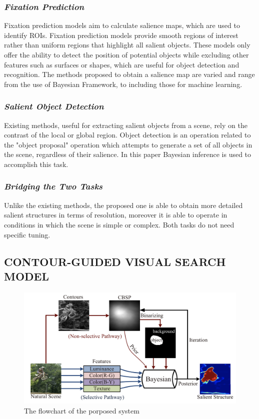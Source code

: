 \subsubsection{\emph{Fixation Prediction}}
Fixation prediction models aim to calculate salience maps, which are used to 
identify ROIs. Fixation prediction models provide smooth regions of interest 
rather than uniform regions that highlight all salient objects. These models 
only offer the ability to detect the position of potential objects while excluding 
other features such as surfaces or shapes, which are useful for object 
detection and recognition. The methods proposed to obtain a salience map 
are varied and range from the use of Bayesian Framework, to including those 
for machine learning. 

\subsubsection{\emph{Salient Object Detection}}
Existing methods, useful for extracting salient objects from a scene, rely on 
the contrast of the local or global region. Object detection is an operation 
related to the "object proposal" operation which attempts to generate a set 
of all objects in the scene, regardless of their salience. In this paper Bayesian 
inference is used to accomplish this task.

\subsubsection{\emph{Bridging the Two Tasks}}
Unlike the existing methods, the proposed one is able to obtain more detailed 
salient structures in terms of resolution, moreover it is able to operate in 
conditions in which the scene is simple or complex. Both tasks do not need 
specific tuning.

\subsection{CONTOUR-GUIDED VISUAL SEARCH MODEL}

\begin{figure}[htbp]
    \centering
    \includegraphics[width = 0.8\linewidth]{images/paper1/selective and non-selective pathways.png}
    \centering
    \caption{The flowchart of the porposed system}
    \label{fid: flowchart}
\end{figure}

